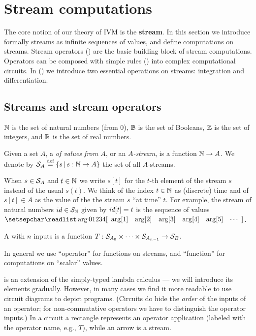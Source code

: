 \section{Stream computations}\label{sec:streams}

The core notion of our theory of IVM is the \textbf{stream}.
In this section we introduce formally streams as
infinite sequences of values, and define computations on streams.
Stream operators () are the basic building block of stream
computations.  Operators can be composed with simple rules ()
into complex computational circuits.
In () we introduce two essential operations on streams:
integration and differentiation.

\subsection{Streams and stream operators}\label{sec:notation}

$\mathbb{N}$ is the set of natural numbers (from 0), $\mathbb{B}$ is the set of
Booleans, $\mathbb{Z}$ is the set of integers, and $\mathbb{R}$ is the set of real
numbers.

\begin{definition}[stream]
Given a set $A$, a  \emph{of values from $A$}, or an
\emph{$A$-stream}, is a function $\mathbb{N} \rightarrow A$.  We denote by
$\stream{A} \defn \{ s \,|\, s : \N \to A \}$ the set of all
$A$-streams.
\end{definition}

When $s\in\mathcal{S}_{A}$ and $t\in\mathbb{N}$ we
write $s[t]$ for the $t$-th element of the stream $s$ instead of the usual $s(t)$.
We think of the index $t\in\mathbb{N}$ as (discrete) time and of $s[t]\in A$
as the value of the the stream $s$ ``at time'' $t$.
\ifstreamexamples
For example, the stream of natural numbers $id \in \mathcal{S}_{\mathbb{N}}$ given by $\mathit{id}[t] = t$ is the sequence of values
$\sv{0 1 2 3 4}$.
\fi

\begin{definition}
A  with $n$ inputs is a function
$T:\mathcal{S}_{A_0}\times\cdots\times\mathcal{S}_{A_{n-1}}\to\mathcal{S}_{B}$.
\end{definition}
In general we use ``operator'' for functions on streams, and
``function'' for computations on ``scalar'' values.

\dbsp is an extension of the simply-typed lambda calculus ---
we will introduce its elements gradually.  However, in many cases we find it more readable to
use circuit diagrams to depict \dbsp programs.
(Circuits do hide the \emph{order} of the inputs of an operator; for non-commutative
operators we have to distinguish the operator inputs.)
In a circuit a rectangle represents an operator application (labeled
with the operator name, e.g., $T$), while an arrow is a stream.

